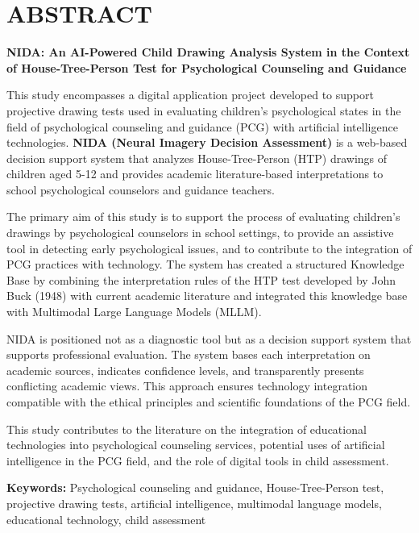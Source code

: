 
\chapter*{ABSTRACT}

\textbf{NIDA: An AI-Powered Child Drawing Analysis System in the Context of House-Tree-Person Test for Psychological Counseling and Guidance}

\vspace{0.5cm}

This study encompasses a digital application project developed to support projective drawing tests used in evaluating children's psychological states in the field of psychological counseling and guidance (PCG) with artificial intelligence technologies. \textbf{NIDA (Neural Imagery Decision Assessment)} is a web-based decision support system that analyzes House-Tree-Person (HTP) drawings of children aged 5-12 and provides academic literature-based interpretations to school psychological counselors and guidance teachers.

The primary aim of this study is to support the process of evaluating children's drawings by psychological counselors in school settings, to provide an assistive tool in detecting early psychological issues, and to contribute to the integration of PCG practices with technology. The system has created a structured Knowledge Base by combining the interpretation rules of the HTP test developed by John Buck (1948) with current academic literature and integrated this knowledge base with Multimodal Large Language Models (MLLM).

NIDA is positioned not as a diagnostic tool but as a decision support system that supports professional evaluation. The system bases each interpretation on academic sources, indicates confidence levels, and transparently presents conflicting academic views. This approach ensures technology integration compatible with the ethical principles and scientific foundations of the PCG field.

This study contributes to the literature on the integration of educational technologies into psychological counseling services, potential uses of artificial intelligence in the PCG field, and the role of digital tools in child assessment.

\vspace{1cm}

\textbf{Keywords:} Psychological counseling and guidance, House-Tree-Person test, projective drawing tests, artificial intelligence, multimodal language models, educational technology, child assessment

\newpage
